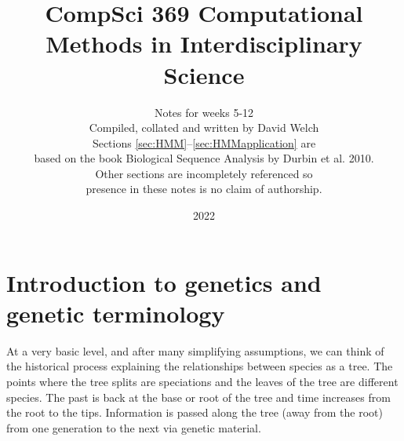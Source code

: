 \documentclass[11pt]{article}
\title{CompSci 369 Computational Methods in Interdisciplinary Science}
\author{Notes for weeks 5-12 \\ Compiled, collated and written by David Welch\\ 
Sections \ref{sec:HMM}--\ref{sec:HMMapplication} are\\ based on the book Biological Sequence Analysis by Durbin et al. 2010. \\ Other sections are incompletely referenced so \\ presence in these notes is no claim of authorship.}
\date{2022}                                           %
\begin{document}
\maketitle

%
%

\tableofcontents
\newpage





%


\section{Introduction to genetics and genetic terminology }


At a very basic level, and after many simplifying assumptions, we can think of the historical process explaining the relationships between species as a tree.   The points where the tree splits are speciations and the leaves of the tree are different  species.  The past is back at the base or root of the tree and time increases from the root to the tips.  Information is passed along  the tree (away from the root) from one generation to the next via genetic material.
\end{document}
